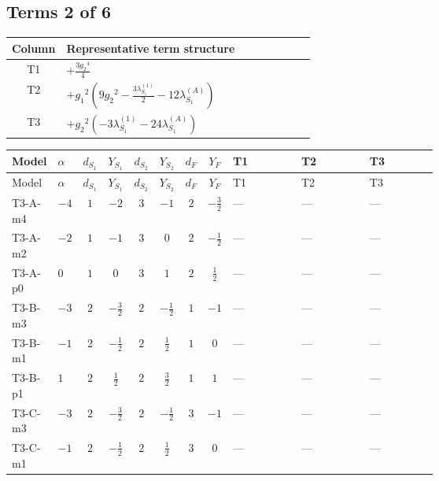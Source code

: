 \documentclass[8pt]{article}
\begin{document}
\begin{landscape}
\subsection*{Terms 2 of 6}
\begin{center}
\begin{tabular}{@{}c >{\raggedright\arraybackslash}p{0.82\linewidth}@{}}
\toprule
Column & Representative term structure \\
\midrule
T1 & \(\displaystyle +\frac{3 {g_2}^4}{4}\) \\
\midrule
T2 & \(\displaystyle +{g_1}^2 \left(9 {g_2}^2-\frac{3 {\lambda_{S_1}^{(1)}}}{2}-12 {\lambda_{S_1}^{(A)}}\right)\) \\
\midrule
T3 & \(\displaystyle +{g_2}^2 (-3 {\lambda_{S_1}^{(1)}}-24 {\lambda_{S_1}^{(A)}})\) \\
\midrule
\bottomrule
\end{tabular}
\end{center}
\smallskip
\tiny
\begin{longtable}{@{}llcccccc >{\raggedright\arraybackslash}p{0.21\linewidth} >{\raggedright\arraybackslash}p{0.21\linewidth} >{\raggedright\arraybackslash}p{0.21\linewidth}@{}}
\toprule
Model & $\alpha$ & $d_{S_1}$ & $Y_{S_1}$ & $d_{S_2}$ & $Y_{S_2}$ & $d_F$ & $Y_F$ & T1 & T2 & T3 \\
\midrule
\endfirsthead
\toprule
Model & $\alpha$ & $d_{S_1}$ & $Y_{S_1}$ & $d_{S_2}$ & $Y_{S_2}$ & $d_F$ & $Y_F$ & T1 & T2 & T3 \\
\midrule
\endhead
T3-A-m4 & $-4$ & $1$ & $-2$ & $3$ & $-1$ & $2$ & $-\frac{3}{2}$ & --- & --- & --- \\
\midrule
T3-A-m2 & $-2$ & $1$ & $-1$ & $3$ & $0$ & $2$ & $-\frac{1}{2}$ & --- & --- & --- \\
\midrule
T3-A-p0 & $0$ & $1$ & $0$ & $3$ & $1$ & $2$ & $\frac{1}{2}$ & --- & --- & --- \\
\midrule
T3-B-m3 & $-3$ & $2$ & $-\frac{3}{2}$ & $2$ & $-\frac{1}{2}$ & $1$ & $-1$ & --- & --- & --- \\
\midrule
T3-B-m1 & $-1$ & $2$ & $-\frac{1}{2}$ & $2$ & $\frac{1}{2}$ & $1$ & $0$ & --- & --- & --- \\
\midrule
T3-B-p1 & $1$ & $2$ & $\frac{1}{2}$ & $2$ & $\frac{3}{2}$ & $1$ & $1$ & --- & --- & --- \\
\midrule
T3-C-m3 & $-3$ & $2$ & $-\frac{3}{2}$ & $2$ & $-\frac{1}{2}$ & $3$ & $-1$ & --- & --- & --- \\
\midrule
T3-C-m1 & $-1$ & $2$ & $-\frac{1}{2}$ & $2$ & $\frac{1}{2}$ & $3$ & $0$ & --- & --- & --- \\

\end{longtable}
\end{landscape}
\end{document}
